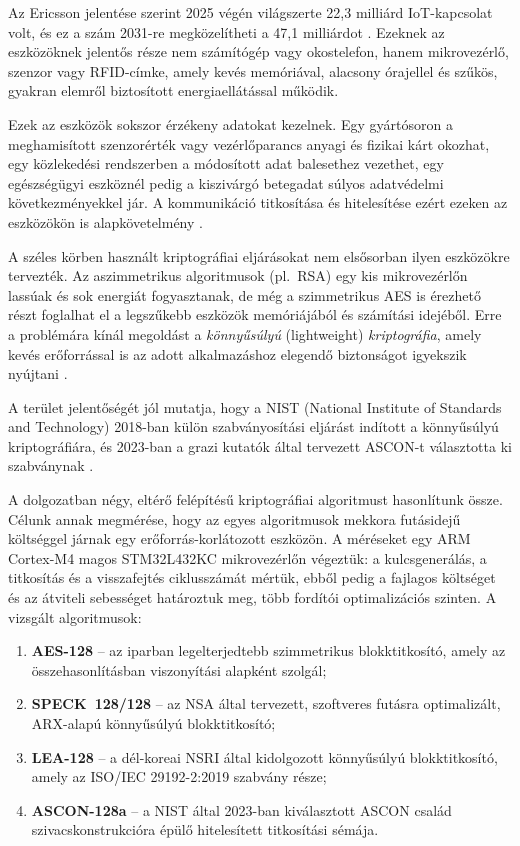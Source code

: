\documentclass[a4paper,12pt]{report}
\theoremstyle{definition}
\theoremstyle{remark}
\begin{document}
Az Ericsson jelentése szerint 2025 végén világszerte 22,3 milliárd IoT-kapcsolat volt, és ez a szám 2031-re megközelítheti a 47,1 milliárdot \cite{Ericsson2026}. Ezeknek az eszközöknek jelentős része nem számítógép vagy okostelefon, hanem mikrovezérlő, szenzor vagy RFID-címke, amely kevés memóriával, alacsony órajellel és szűkös, gyakran elemről biztosított energiaellátással működik.

Ezek az eszközök sokszor érzékeny adatokat kezelnek. Egy gyártósoron a meghamisított szenzorérték vagy vezérlőparancs anyagi és fizikai kárt okozhat, egy közlekedési rendszerben a módosított adat balesethez vezethet, egy egészségügyi eszköznél pedig a kiszivárgó betegadat súlyos adatvédelmi következményekkel jár. A kommunikáció titkosítása és hitelesítése ezért ezeken az eszközökön is alapkövetelmény \cite{Hossain2015}.

A széles körben használt kriptográfiai eljárásokat nem elsősorban ilyen eszközökre tervezték. Az aszimmetrikus algoritmusok (pl.~RSA) egy kis mikrovezérlőn lassúak és sok energiát fogyasztanak, de még a szimmetrikus AES is érezhető részt foglalhat el a legszűkebb eszközök memóriájából és számítási idejéből. Erre a problémára kínál megoldást a \emph{könnyűsúlyú} (lightweight) \emph{kriptográfia}, amely kevés erőforrással is az adott alkalmazáshoz elegendő biztonságot igyekszik nyújtani \cite{NISTIR8114}.

A terület jelentőségét jól mutatja, hogy a NIST (National Institute of Standards and Technology) 2018-ban külön szabványosítási eljárást indított a könnyűsúlyú kriptográfiára, és 2023-ban a grazi kutatók által tervezett ASCON-t választotta ki szabványnak \cite{NISTLWC2023}.

\bigskip

A dolgozatban négy, eltérő felépítésű kriptográfiai algoritmust hasonlítunk össze. Célunk annak megmérése, hogy az egyes algoritmusok mekkora futásidejű költséggel járnak egy erőforrás-korlátozott eszközön. A méréseket egy ARM Cortex-M4 magos STM32L432KC mikrovezérlőn végeztük: a kulcsgenerálás, a titkosítás és a visszafejtés ciklusszámát mértük, ebből pedig a fajlagos költséget és az átviteli sebességet határoztuk meg, több fordítói optimalizációs szinten. A vizsgált algoritmusok:

\begin{enumerate}
	\item \textbf{AES-128} -- az iparban legelterjedtebb szimmetrikus blokktitkosító, amely az összehasonlításban viszonyítási alapként szolgál;
	\item \textbf{SPECK~128/128} -- az NSA által tervezett, szoftveres futásra optimalizált, ARX-alapú könnyűsúlyú blokktitkosító;
	\item \textbf{LEA-128} -- a dél-koreai NSRI által kidolgozott könnyűsúlyú blokktitkosító, amely az ISO/IEC 29192-2:2019 szabvány része;
	\item \textbf{ASCON-128a} -- a NIST által 2023-ban kiválasztott ASCON család szivacskonstrukcióra épülő hitelesített titkosítási sémája.
\end{enumerate}
\end{document}

